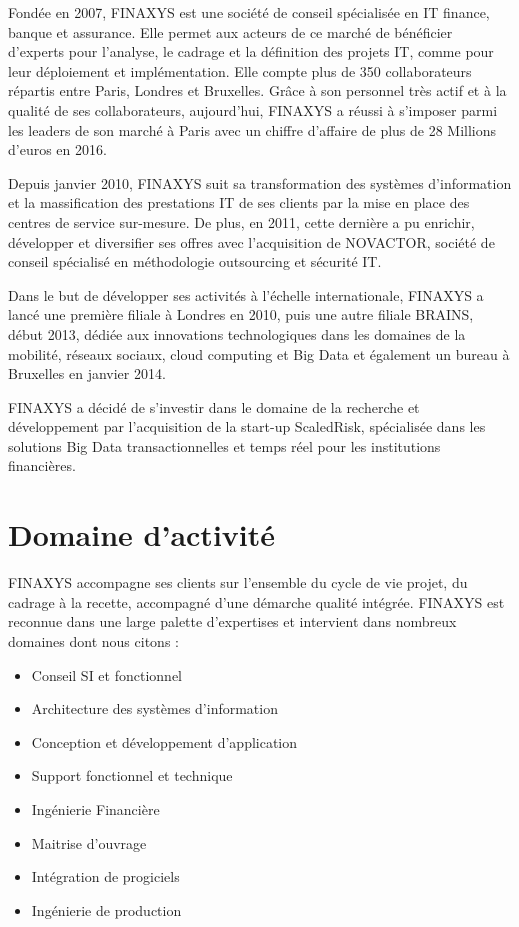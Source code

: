Fondée en 2007, FINAXYS est une société de conseil spécialisée en IT finance, banque et assurance. Elle permet aux acteurs de ce marché de bénéficier d’experts pour l’analyse, le cadrage et la définition des projets IT, comme pour leur déploiement et implémentation. Elle compte plus de 350 collaborateurs répartis entre Paris, Londres et Bruxelles. Grâce à son personnel très actif et à la qualité de ses collaborateurs, aujourd’hui, FINAXYS a réussi à s’imposer parmi les leaders de son marché à Paris avec un chiffre d’affaire de plus de 28 Millions d’euros en 2016. 
\par Depuis janvier 2010, FINAXYS suit sa transformation des systèmes d’information et la massification des prestations IT de ses clients par la mise en place des centres de service sur-mesure. De plus, en 2011, cette dernière a pu enrichir, développer et diversifier ses offres avec l’acquisition de NOVACTOR, société de conseil spécialisé en méthodologie outsourcing et sécurité IT. 
\par Dans le but de développer ses activités à l’échelle internationale, FINAXYS a lancé une première filiale à Londres en 2010, puis une autre filiale BRAINS, début 2013, dédiée aux innovations technologiques dans les domaines de la mobilité, réseaux sociaux, cloud computing et Big Data et également un bureau à Bruxelles en janvier 2014.
\par FINAXYS a décidé de s’investir dans le domaine de la recherche et développement par l’acquisition de la start-up ScaledRisk, spécialisée dans les solutions Big Data transactionnelles et temps réel pour les institutions financières.


\section{Domaine d'activité}
FINAXYS accompagne ses clients sur l’ensemble du cycle de vie projet, du cadrage à la recette, accompagné d’une démarche qualité intégrée. FINAXYS est reconnue dans une large palette d’expertises et intervient dans nombreux domaines dont nous citons :
\begin{itemize}  
    \item Conseil SI et fonctionnel
    \item Architecture des systèmes d’information
    \item Conception et développement d’application
    \item Support fonctionnel et technique
    \item Ingénierie Financière
    \item Maitrise d’ouvrage
    \item Intégration de progiciels
    \item Ingénierie de production
\end{itemize}

